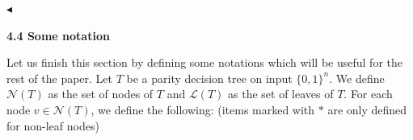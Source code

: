 \documentclass[10pt,a4paper]{article}
\begin{document}
$\blacktriangleleft$\par






\par\medskip\noindent\textbf{
4.4 Some notation}\par




Let us finish this section by defining some notations which will be useful for the rest of the paper. Let $T$ be a parity decision tree on input $\{0,1\}^{n}$. We define $\mathcal{N}(T)$ as the set of nodes of $T$ and $\mathcal{L}(T)$ as the set of leaves of $T$. For each node $v\in\mathcal{N}(T)$, we define the following: (items marked with $\bm{*}$ are only defined for non-leaf nodes)\par
\end{document}
